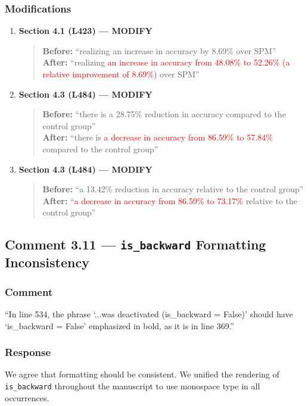 \documentclass[11pt,a4paper]{article}
\begin{document}
\subsubsection{Modifications}
\begin{enumerate}
\item \textbf{Section 4.1 (L423) --- MODIFY}
\begin{quote}
\textbf{Before:} ``realizing an increase in accuracy by 8.69\% over SPM''\\[4pt]
\textbf{After:} ``realizing \textcolor{red}{an increase in accuracy from 48.08\% to 52.26\% (a relative improvement of 8.69\%)} over SPM''
\end{quote}

\item \textbf{Section 4.3 (L484) --- MODIFY}
\begin{quote}
\textbf{Before:} ``there is a 28.75\% reduction in accuracy compared to the control group''\\[4pt]
\textbf{After:} ``there is \textcolor{red}{a decrease in accuracy from 86.59\% to 57.84\%} compared to the control group''
\end{quote}

\item \textbf{Section 4.3 (L484) --- MODIFY}
\begin{quote}
\textbf{Before:} ``a 13.42\% reduction in accuracy relative to the control group''\\[4pt]
\textbf{After:} ``\textcolor{red}{a decrease in accuracy from 86.59\% to 73.17\%} relative to the control group''
\end{quote}
\end{enumerate}

\subsection{Comment 3.11 --- \texttt{is\_backward} Formatting Inconsistency}

\subsubsection{Comment}
``In line 534, the phrase `...was deactivated (is\_backward = False)' should have `is\_backward = False' emphasized in bold, as it is in line 369.''

\subsubsection{Response}
We agree that formatting should be consistent. We unified the rendering of \texttt{is\_backward} throughout the manuscript to use monospace type in all occurrences.
\end{document}
